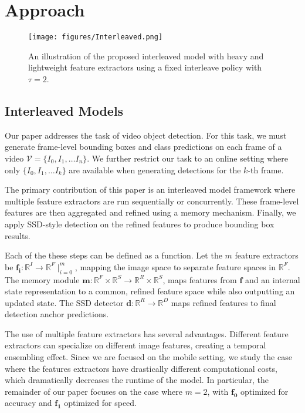\documentclass[10pt,twocolumn,letterpaper]{article}
\begin{document}
\section{Approach}

\begin{figure}[b]
\begin{center}
\texttt{[image: figures/Interleaved.png]}
\end{center}
\vspace{-2em}
  \caption{An illustration of the proposed interleaved model with heavy and lightweight feature extractors using a fixed interleave policy with $\tau=2$.}
\label{fig:Interleaved}
\end{figure}


\subsection{Interleaved Models}
Our paper addresses the task of video object detection. For this task, we must generate frame-level bounding boxes and class predictions on each frame of a video $\mathcal{V} = \{I_0, I_1,\ldots I_n\}$. We further restrict our task to an online setting where only  $\{I_0, I_1,\ldots I_k\}$ are available when generating detections for the $k$-th frame.

The primary contribution of this paper is an interleaved model framework where multiple feature extractors are run sequentially or concurrently. These frame-level features are then aggregated and refined using a memory mechanism. Finally, we apply SSD-style \cite{liu2016ssd} detection on the refined features to produce bounding box results.

Each of the these steps can be defined as a function. Let the $m$ feature extractors be $\mathbf{f_i}: \mathbb{R}^I \to \mathbb{R}^{F} \mid_{i=0}^m$,  mapping the image space to separate feature spaces in $\mathbb{R}^{F}$. The memory module $\mathbf{m}: \mathbb{R}^F \times \mathbb{R}^S \to \mathbb{R}^R \times \mathbb{R}^S$, maps features from $\mathbf{f}$ and an internal state representation to a common, refined feature space while also outputting an updated state. The SSD detector $\mathbf{d}: \mathbb{R}^R \to \mathbb{R}^{D}$ maps refined features to final detection anchor predictions.

The use of multiple feature extractors has several advantages. Different feature extractors can specialize on different image features, creating a temporal ensembling effect. Since we are focused on the mobile setting, we study the case where the features extractors have drastically different computational costs, which dramatically decreases the runtime of the model. In particular, the remainder of our paper focuses on the case where $m=2$, with $\mathbf{f_0}$ optimized for accuracy and $\mathbf{f_1}$ optimized for speed.
\end{document}
